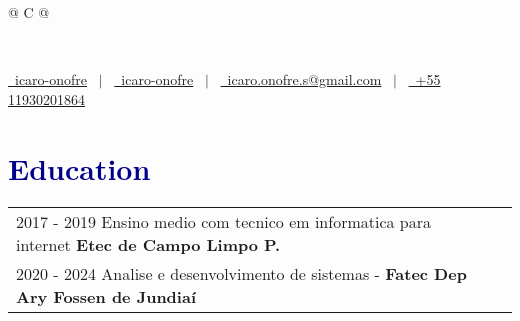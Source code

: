 \documentclass[a4paper,12pt]{article}
\begin{document}
\pagestyle{empty} 



\begin{tabularx}{\linewidth}{@{} C @{}}
\begin{flushleft}
	\fontsize{30}{60} \\[10pt]
\end{flushleft}
\color{black}
\href{https://github.com/icaro-onofre}{\raisebox{-0.05\height}\faGithub\ icaro-onofre} \ $|$ \ 
\href{https://linkedin.com/in/icaro-onofre}{\raisebox{-0.05\height}\faLinkedin\ icaro-onofre} \ $|$ \ 
\href{mailto:icaro.onofre.s@gmail.com}{\raisebox{-0.05\height}\faEnvelope \ icaro.onofre.s@gmail.com} \ $|$ \ 
\href{tel:+11930201864}{\raisebox{-0.05\height}\faMobile \ +55 11930201864} \\
\end{tabularx}
\section{{\textcolor{darkblue}{\textbf{Education}}}}
\begin{tabularx}{\linewidth}{@{}l X@{}}	

	2017 - 2019 Ensino medio com tecnico em informatica para internet \textbf{Etec de Campo Limpo P.} \\

2020 - 2024 Analise e desenvolvimento de sistemas - \textbf{Fatec Dep Ary Fossen de Jundiaí} \\

\end{tabularx}
\end{document}
